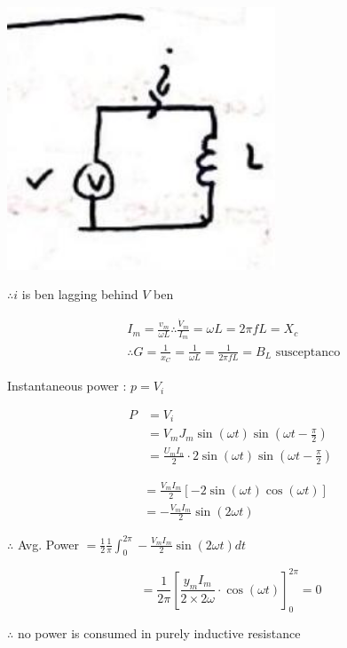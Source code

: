 \documentclass[12pt, a4paper]{article}
\newcommand{\figwidth}{8cm}
\begin{document}
	\begin{center}
		\includegraphics[max width=\figwidth]{2024_06_15_74bbabba7981675b0d49g-05(4)}
	\end{center}

$\therefore i$ is ben lagging behind $V$ ben

	$$
		\begin{aligned}
			 & I_{m}=\frac{v_{m}}{\omega L} \therefore \frac{\dot{V}_{m}}{I_{m}}=\omega L=2 \pi f L=X_{c}      \\
			 & \therefore G=\frac{1}{x_{C}}=\frac{1}{\omega L}=\frac{1}{2 \pi f L}=B_{L} \text { susceptanco }
		\end{aligned}
	$$

	Instantaneous power : $p=V_{i}$

	$$
		\begin{aligned}
			P & =V_{i}                                                                                  \\
			  & =V_{m} J_{m} \sin (\omega t) \sin \left(\omega t-\frac{\pi}{2}\right)                   \\
			  & =\frac{U_{m} I_{n}}{2} \cdot 2 \sin (\omega t) \sin \left(\omega t-\frac{\pi}{2}\right)
		\end{aligned}
	$$

	$$
		\begin{aligned}
			 & =\frac{V_{m} I_{m}}{2}[-2 \sin (\omega t) \cos (\omega t)] \\
			 & =-\frac{V_{m} I_{m}}{2} \sin (2 \omega t)
		\end{aligned}
	$$

$\therefore$ Avg. Power $=\frac{1}{2} \frac{1}{\pi} \int_{0}^{2 \pi}-\frac{V_{m} I_{m}}{2} \sin (2 \omega t) d t$

	$$
		=\frac{1}{2 \pi}\left[\frac{y_{m} I_{m}}{2 \times 2 \omega} \cdot \cos (\omega t)\right]_{0}^{2 \pi}=0
	$$

$\therefore$ no power is consumed in purely inductive resistance
\end{document}
